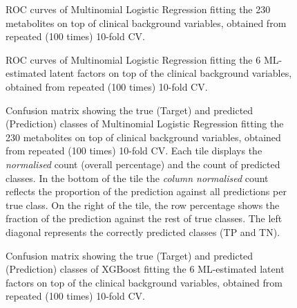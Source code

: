 \documentclass{amsart}
\begin{document}
\begin{figure}[h]
  
  \caption{\label{roc:full}ROC curves of Multinomial Logistic Regression fitting the 230 metabolites on top of clinical background variables, obtained from repeated (100 times) 10-fold CV. }
\end{figure} \clearpage
\begin{figure}[h]
  
  \caption{\label{roc:6mlogit} ROC curves of Multinomial Logistic Regression fitting the 6 ML-estimated latent factors on top of the clinical background variables, obtained from repeated (100 times) 10-fold CV. }
  \end{figure} 
\begin{figure}[h]
  
  \caption{Confusion matrix showing the true (Target) and predicted (Prediction) classes of Multinomial Logistic Regression fitting the 230 metabolites on top of clinical background variables, obtained from repeated (100 times) 10-fold CV. Each tile displays the \textit{normalised} count (overall percentage) and the count of predicted classes. In the bottom of the tile the \textit{column normalised} count reflects the proportion of the prediction against all predictions per true class. On the right of the tile, the row percentage shows the fraction of the prediction against the rest of true classes. The left diagonal represents the correctly predicted classes (TP and TN).}
  \label{cm:full}
\end{figure} \clearpage
\begin{figure}[ht]
    
    \caption{Confusion matrix showing the true (Target) and predicted (Prediction) classes of XGBoost fitting the 6 ML-estimated latent factors on top of the clinical background variables, obtained from repeated (100 times) 10-fold CV.}
  \label{cm:xgboost}
\end{figure}
\end{document}
